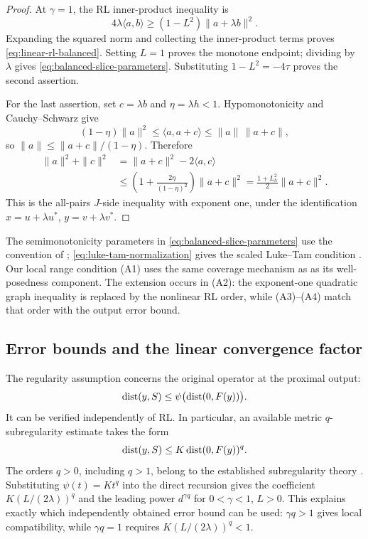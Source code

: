 \begin{proof}
At $\gamma=1$, the RL inner-product inequality is
\[
 4\lambda\langle a,b\rangle
 \ge(1-L^2)\|a+\lambda b\|^2.
\]
Expanding the squared norm and collecting the inner-product terms proves
\eqref{eq:linear-rl-balanced}.  Setting $L=1$ proves the monotone endpoint;
dividing by $\lambda$ gives \eqref{eq:balanced-slice-parameters}.  Substituting
$1-L^2=-4\tau$ proves the second assertion.

For the last assertion, set $c=\lambda b$ and $\eta=\lambda h<1$.
Hypomonotonicity and Cauchy--Schwarz give
\[
 (1-\eta)\|a\|^2
 \le\langle a,a+c\rangle
 \le\|a\|\,\|a+c\|,
\]
so $\|a\|\le\|a+c\|/(1-\eta)$.  Therefore
\[
 \begin{split}
 \|a\|^2+\|c\|^2
 &=\|a+c\|^2-2\langle a,c\rangle\\
 &\le\left(1+\frac{2\eta}{(1-\eta)^2}\right)\|a+c\|^2
 =\frac{1+L_h^2}{2}\|a+c\|^2.
 \end{split}
\]
This is the all-pairs $J$-side inequality with exponent one, under the
identification $x=u+\lambda u^*$, $y=v+\lambda v^*$.
\end{proof}

The semimonotonicity parameters in
\eqref{eq:balanced-slice-parameters} use the convention of
\cite{EvensPasLatafatPatrinos2025SemimonotonePPA};
\eqref{eq:luke-tam-normalization} gives the scaled Luke--Tam condition
\cite{LukeTam2025GeneralizedMonotonicity}.  Our local range condition (A1)
uses the same coverage mechanism as
\cite[Assumption~2(d)(ii)]{LukeTam2025GeneralizedMonotonicity} as its
well-posedness component.  The extension occurs in (A2): the exponent-one
quadratic graph inequality is replaced by the nonlinear RL order, while
(A3)--(A4) match that order with the output error bound.

\subsection{Error bounds and the linear convergence factor}

The regularity assumption concerns the original operator at the proximal
output:
\[
 \operatorname{dist}(y,S)\le\psi\bigl(\operatorname{dist}(0,F(y))\bigr).
\]
It can be verified independently of RL.  In particular, an available
metric $q$-subregularity estimate takes the form
\begin{equation}
 \operatorname{dist}(y,S)\le K\operatorname{dist}(0,F(y))^q.
 \label{eq:power-eb-comparison}
\end{equation}
The orders $q>0$, including $q>1$, belong to the established subregularity
theory \cite{LiMordukhovich2012HolderSubregularityPPA,
MordukhovichOuyang2015HigherOrderSubregularity}.  Substituting
$\psi(t)=Kt^q$ into the direct recursion gives the coefficient
$K(L/(2\lambda))^q$ and the leading power $d^{\gamma q}$ for
$0<\gamma<1$, $L>0$.  This explains exactly which independently obtained
error bound can be used: $\gamma q>1$ gives local compatibility, while
$\gamma q=1$ requires $K(L/(2\lambda))^q<1$.

